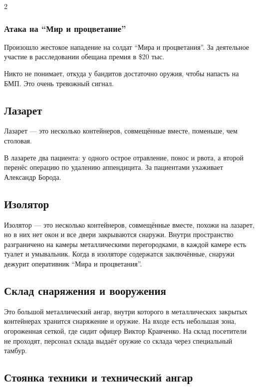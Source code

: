 \documentclass[twoside]{article}
\begin{document}
\begin{multicols}{2}
\subsubsection{Атака на \enquote{Мир и процветание}}\label{pap-under-attack}

Произошло жестокое нападение на солдат \enquote{Мира и процветания}. За
деятельное участие в расследовании обещана премия в \$20 тыс.

Никто не понимает, откуда у бандитов достаточно оружия, чтобы напасть на
БМП. Это очень тревожный сигнал.

\subsection{Лазарет}\label{infirmary}

Лазарет --- это несколько контейнеров, совмещённые вместе, поменьше, чем
столовая.

В лазарете два пациента: у одного острое отравление, понос и рвота, а
второй перенёс операцию по удалению аппендицита. За пациентами ухаживает
Александр Борода.

\subsection{Изолятор}\label{brig}

Изолятор --- это несколько контейнеров, совмещённые вместе, похожи на
лазарет, но в них нет окон и все двери закрываются снаружи. Внутри
пространство разграничено на камеры металлическими перегородками, в
каждой камере есть туалет и умывальник. Когда в изоляторе содержатся
заключённые, снаружи дежурит оперативник \enquote{Мира и процветания}.

\subsection{Склад снаряжения и вооружения}\label{equipment-storage}

Это большой металлический ангар, внутри которого в металлических
закрытых контейнерах хранится снаряжение и оружие. На входе есть
небольшая зона, огороженная сеткой, где сидит офицер Виктор Кравченко.
На склад посетители не проходят, персонал склада выдаёт оружие со склада
через специальный тамбур.

\subsection{Стоянка техники и технический ангар}\label{vehicle-parking}


\end{multicols}
\end{document}
